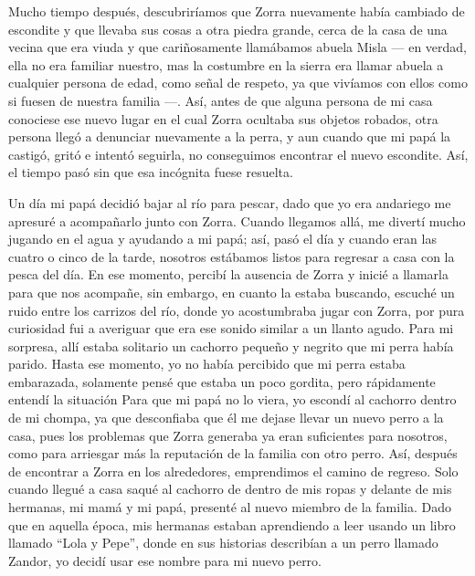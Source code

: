Mucho tiempo después, descubriríamos que Zorra nuevamente había cambiado de escondite y que llevaba sus cosas a otra piedra grande, cerca de la casa de una vecina que era viuda y que cariñosamente llamábamos abuela Misla --- en verdad, ella no era familiar nuestro, mas la costumbre en la sierra era llamar abuela a cualquier persona de edad, como señal de respeto, ya que vivíamos con ellos como si fuesen de nuestra familia ---.
Así, antes de que alguna persona de mi casa conociese ese nuevo lugar en el cual Zorra ocultaba sus objetos robados, otra persona llegó a denunciar nuevamente a la perra, y aun cuando que mi papá la castigó, gritó e intentó seguirla, no conseguimos encontrar el nuevo escondite. Así, el tiempo pasó sin que esa incógnita fuese resuelta.

Un día mi papá decidió bajar al río para pescar, dado que yo era andariego me apresuré a acompañarlo junto con Zorra. 
Cuando llegamos allá, me divertí mucho jugando en el agua y ayudando a mi papá; así, pasó el día y cuando eran las cuatro o cinco de la tarde, nosotros estábamos listos para regresar a casa con la pesca del día.
En ese momento, percibí la ausencia de Zorra y inicié a llamarla para que nos acompañe, 
sin embargo, en cuanto la estaba buscando, escuché un ruido entre los carrizos del río, donde yo acostumbraba jugar con Zorra, por pura curiosidad fui a averiguar que era ese sonido similar a un llanto agudo. Para mi sorpresa, allí estaba solitario un cachorro pequeño y negrito que mi perra había parido.
Hasta ese momento, yo no había percibido que mi perra estaba embarazada, solamente pensé que estaba un poco gordita,
pero rápidamente entendí la situación
Para que mi papá no lo viera, yo escondí al cachorro dentro de mi chompa, ya que desconfiaba que él me dejase llevar un nuevo perro a la casa, pues los problemas que Zorra generaba ya eran suficientes para nosotros, como para arriesgar más la reputación de la familia con otro perro.
Así, después de encontrar a Zorra en los alrededores, emprendimos el camino de regreso.
Solo cuando llegué a casa saqué al cachorro de dentro de mis ropas y delante de mis hermanas, mi mamá y mi papá, presenté al nuevo miembro de la familia. Dado que en aquella época, mis hermanas estaban aprendiendo a leer usando un libro llamado ``Lola y Pepe'', donde en sus historias describían a un perro llamado Zandor, yo decidí usar ese nombre para mi nuevo perro.

